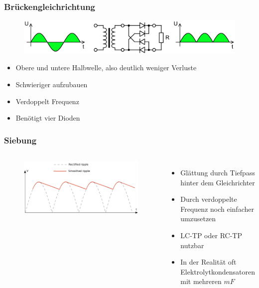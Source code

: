 \begin{frame}
  \frametitle{Brückengleichrichtung}
  \begin{center}
    \begin{figure}
      \includegraphics[width=1\textwidth,height=.6\textheight,keepaspectratio]{a05/Gratz_rectifier.png}
    \end{figure}
    \begin{itemize}
      \item Obere und untere Halbwelle, also deutlich weniger Verluste
      \item Schwieriger aufzubauen
      \item Verdoppelt Frequenz
      \item Benötigt vier Dioden
    \end{itemize}
  \end{center}
\end{frame}

\begin{frame}
  \frametitle{Siebung}
  \begin{columns}[c]
    \begin{center}
      \begin{figure}
        \includegraphics[width=1\textwidth,height=.75\textheight,keepaspectratio]{a05/Smoothed_ripple.png}
      \end{figure}
    \end{center}
    \begin{itemize}
      \item Glättung durch Tiefpass hinter dem Gleichrichter
      \item Durch verdoppelte Frequenz noch einfacher umzusetzen
      \item LC-TP oder RC-TP nutzbar
      \item In der Realität oft Elektrolytkondensatoren mit mehreren $mF$
    \end{itemize}
  \end{columns}
\end{frame}

